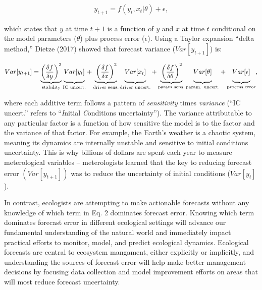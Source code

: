 \documentclass[12pt,]{article}
\begin{document}
\begin{align}
y_{t+1} = f(y_t, x_t|\theta) + \epsilon,
\end{align}

\vspace{-0.5em} which states that \(y\) at time \(t+1\) is a function of
\(y\) and \(x\) at time \(t\) conditional on the model parameters
(\(\theta\)) plus process error (\(\epsilon\)). Using a Taylor expansion
``delta method,'' Dietze (2017) showed that forecast variance
(\(Var[y_{t+1}]\)) is: \vspace{-1em}

\begin{align}
Var[y_{t+1}] = \underbrace{\left(\frac{\delta f}{\delta y} \right)^2}_{\text{stability}} 
               \underbrace{\vphantom{ \left(\frac{\delta f}{\delta y} \right)^2 } Var[y_t]}_{\text{IC uncert.}} +
               \underbrace{\vphantom{ \left(\frac{\delta f}{\delta y} \right)^2 }\left(\frac{\delta f}{\delta x} \right)^2}_{\text{driver sens.}} 
               \underbrace{\vphantom{ \left(\frac{\delta f}{\delta y} \right)^2 } Var[x_t]}_{\text{driver uncert.}} +
               \underbrace{\vphantom{ \left(\frac{\delta f}{\delta y} \right)^2 }\left(\frac{\delta f}{\delta \theta} \right)^2}_{\text{param sens.}}
               \underbrace{\vphantom{ \left(\frac{\delta f}{\delta y} \right)^2 } Var[\theta]}_{\text{param. uncert.}} +
               \underbrace{\vphantom{ \left(\frac{\delta f}{\delta y} \right)^2 } Var[\epsilon]}_{\text{process error}},
\end{align}

where each additive term follows a pattern of \emph{sensitivity} times
\emph{variance} (``IC uncert.'' refers to ``\emph{I}nitial
\emph{C}onditions uncertainty''). The variance attributable to any
particular factor is a function of how sensitive the model is to the
factor and the variance of that factor. For example, the Earth's weather
is a chaotic system, meaning its dynamics are internally unstable and
sensitive to initial conditions uncertainty. This is why billions of
dollars are spent each year to measure meterological variables --
meterologists learned that the key to reducing forecast error
\((Var[y_{t+1}])\) was to reduce the uncertainty of initial conditions
(\(Var[y_t]\)).

In contrast, ecologists are attempting to make actionable forecasts
without any knowledge of which term in Eq. 2 dominates forecast error.
Knowing which term dominates forecast error in different ecological
settings will advance our fundamental understanding of the natural world
and immediately impact practical efforts to monitor, model, and predict
ecological dynamics. Ecological forecasts are central to ecosystem
mangament, either explicitly or implicitly, and understanding the
sources of forecast error will help make better management decisions by
focusing data collection and model improvement efforts on areas that
will most reduce forecast uncertainty.
\end{document}
